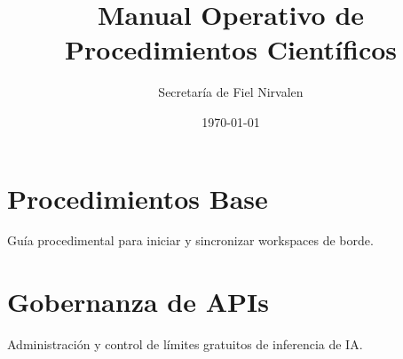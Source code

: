 \documentclass{report}
\title{Manual Operativo de Procedimientos Científicos}
\author{Secretaría de Fiel Nirvalen}
\date{\today}
\begin{document}
\maketitle
\tableofcontents

\chapter{Procedimientos Base}
Guía procedimental para iniciar y sincronizar workspaces de borde.

\chapter{Gobernanza de APIs}
Administración y control de límites gratuitos de inferencia de IA.
\end{document}
